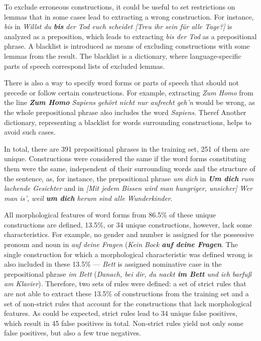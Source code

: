 To exclude erroneous constructions, it could be useful to set restrictions on lemmas that in some cases lead to extracting a wrong construction. For instance, \textit{bis} in \textit{Willst du \textbf{bis} der Tod euch scheidet [Treu ihr sein für alle Tage?]} is analyzed as a preposition, which leads to extracting \textit{bis der Tod} as a prepositional phrase. A blacklist is introduced as means of excluding constructions with some lemmas from the result. The blacklist is a dictionary, where language-specific parts of speech correspond lists of excluded lemmas.

There is also a way to specify word forms or parts of speech that should not precede or follow certain constructions. For example, extracting \textit{Zum Homo} from the line \textit{\textbf{Zum Homo} Sapiens gehört nicht nur aufrecht geh'n} would be wrong, as the whole prepositional phrase also includes the word \textit{Sapiens}. Theref
Another dictionary, representing a blacklist for words surrounding constructions, helps to avoid such cases.

In total, there are 391 prepositional phrases in the training set, 251 of them are unique. Constructions were considered the same if the word forms constituting them were the same, independent of their surrounding words and the structure of the sentence, as, for instance, the prepositional phrase \textit{um dich} in \textit{\textbf{Um dich} rum lachende Gesichter} and in \textit{[Mit jedem Bissen wird man hungriger, unsicher] Wer man is', weil \textbf{um dich} herum sind alle Wunderkinder}. 

All morphological features of word forms from 86.5\% of these unique constructions are defined, 13.5\%, or 34 unique constructions, however, lack some characteristics. For example, no gender and number is assigned for the possessive pronoun and noun in \textit{auf deine Fragen} (\textit{Kein Bock \textbf{auf deine Fragen}}. The single construction for which a morphological characteristic was defined wrong is also included in these 13.5\% --- \textit{Bett} is assigned nominative case in the prepositional phrase \textit{im Bett} (\textit{Danach, bei dir, du nackt \textbf{im Bett} und ich barfuß am Klavier}). Therefore, two sets of rules were defined: a set of strict rules that are not able to extract these 13.5\% of constructions from the training set and a set of non-strict rules that account for the constructions that lack morphological features. As could be expected, strict rules lead to 34 unique false positives, which result in 45 false positives in total. Non-strict rules yield not only some false positives, but also a few true negatives.

